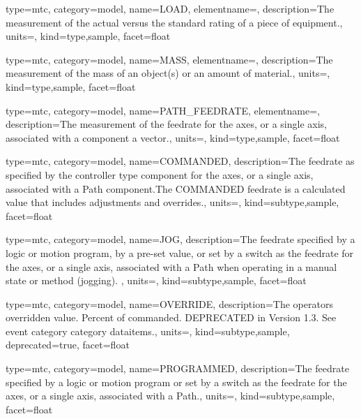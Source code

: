 {
  type=mtc,
  category=model,
  name={LOAD},
  elementname=,
  description={The measurement of the actual versus the standard rating of a piece of equipment.},
  units=,
  kind={type,sample},
  facet={\gls{float}}
}


{
  type=mtc,
  category=model,
  name={MASS},
  elementname=,
  description={The measurement of the mass of an object(s) or an amount of material.},
  units=,
  kind={type,sample},
  facet={\gls{float}}
}


{
  type=mtc,
  category=model,
  name={PATH\_FEEDRATE},
  elementname=,
  description={The measurement of the feedrate for the axes, or a single axis, associated with a  component a vector.},
  units=,
  kind={type,sample},
  facet={\gls{float}}
}



{
  type=mtc,
  category=model,
  name={COMMANDED},
  description={The feedrate as specified by the \gls{controller} type component for the axes, or a single axis, associated with a Path component.The COMMANDED feedrate is a calculated value that includes adjustments and overrides.},
  units=,
  kind={subtype,sample},
  facet={\gls{float}}
}


{
  type=mtc,
  category=model,
  name={JOG},
  description={The feedrate specified by a logic or motion program, by a pre-set value, or set by a switch as the feedrate for the axes, or a single axis, associated with a Path when operating in a manual state or method (jogging).  },
  units=,
  kind={subtype,sample},
  facet={\gls{float}}
}


{
  type=mtc,
  category=model,
  name={OVERRIDE},
  description={The operators overridden value.  Percent of commanded. DEPRECATED in Version 1.3.   See \gls{event category} category \glspl{dataitem}.},
  units=,
  kind={subtype,sample},
  deprecated={true},
  facet={\gls{float}}
}


{
  type=mtc,
  category=model,
  name={PROGRAMMED},
  description={The feedrate specified by a logic or motion program or set by a switch as the feedrate for the axes, or a single axis, associated with a Path.},
  units=,
  kind={subtype,sample},
  facet={\gls{float}}
}


